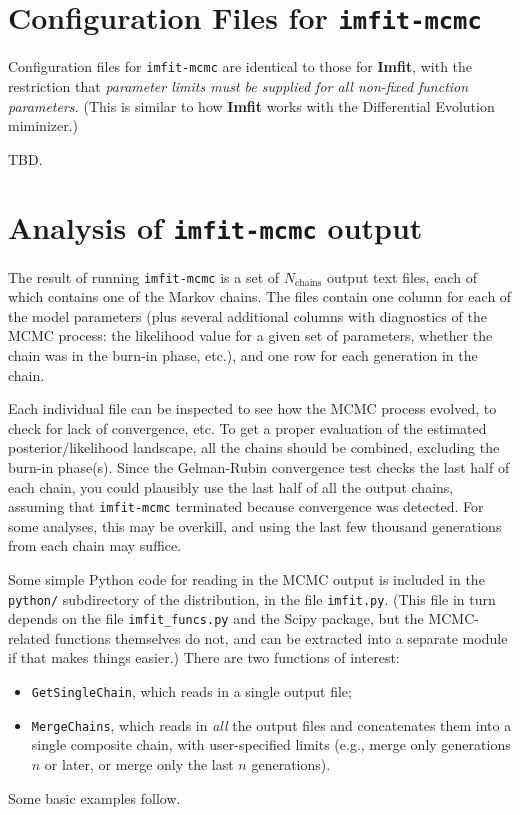 \documentclass[10pt,a4paper,article]{memoir}
\newcommand{\imfit}{\textbf{Imfit}}
\newcommand{\imfitmcmc}{\texttt{imfit-mcmc}}
\begin{document}
\section{Configuration Files for \imfitmcmc{}}

Configuration files for \imfitmcmc{} are identical to those for \imfit{}, with
the restriction that \textit{parameter limits must be supplied for all non-fixed
function parameters.} (This is similar to how \imfit{} works with the Differential
Evolution miminizer.)

TBD.



\section{Analysis of \imfitmcmc{} output}

The result of running \imfitmcmc{} is a set of $N_{\textrm{chains}}$
output text files, each of which contains one of the Markov chains. The
files contain one column for each of the model parameters (plus several
additional columns with diagnostics of the MCMC process: the likelihood
value for a given set of parameters, whether the chain was in the
burn-in phase, etc.), and one row for each generation in the chain.

Each individual file can be inspected to see how the MCMC process
evolved, to check for lack of convergence, etc. To get a proper
evaluation of the estimated posterior/likelihood landscape, all the
chains should be combined, excluding the burn-in phase(s). Since the
Gelman-Rubin convergence test checks the last half of each chain, you
could plausibly use the last half of all the output chains, assuming
that \imfitmcmc{} terminated because convergence was detected. For some
analyses, this may be overkill, and using the last few thousand
generations from each chain may suffice.

Some simple Python code for reading in the MCMC output is included in
the \texttt{python/} subdirectory of the distribution, in the file
\texttt{imfit.py}. (This file in turn depends on the file
\texttt{imfit\_funcs.py} and the Scipy package, but the MCMC-related
functions themselves do not, and can be extracted into a separate module
if that makes things easier.) There are two functions of interest: 
\begin{itemize}
\item \texttt{GetSingleChain}, which reads in a single output file; 
\item \texttt{MergeChains}, which reads in \textit{all} the output files and 
concatenates them into a single composite chain, with user-specified limits 
(e.g., merge only generations $n$ or later, or merge only the last $n$ generations).
\end{itemize}
Some basic examples follow.
\end{document}
